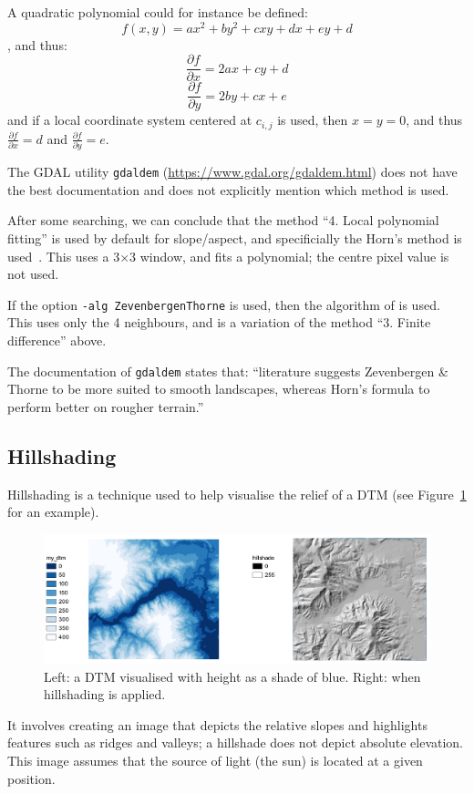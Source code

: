A quadratic polynomial could for instance be defined:
\[
  f(x,y) = ax^2 + by^2 + cxy + dx + ey +d
\]
, and thus:
\[
  \frac{\partial f}{\partial x} = 2ax + cy + d
\]
\[
  \frac{\partial f}{\partial y} = 2by + cx + e
\]
and if a local coordinate system centered at $c_{i,j}$ is used, then $x = y = 0$, and thus $\frac{\partial f}{\partial x} = d$ and $\frac{\partial f}{\partial y} = e$.


\begin{myfloat}
  \begin{practice-box}
  The GDAL utility \texttt{gdaldem} (\url{https://www.gdal.org/gdaldem.html}) does not have the best documentation and does not explicitly mention which method is used.

  After some searching, we can conclude that the method ``4. Local polynomial fitting'' is used by default for slope/aspect, and specificially the Horn's method is used~\citep{Horn81}.
  This uses a 3$\times$3 window, and fits a polynomial; the centre pixel value is not used.

  If the option \texttt{-alg ZevenbergenThorne} is used, then the algorithm of \citet{Zevenbergen87} is used. 
  This uses only the 4 neighbours, and is a variation of the method ``3. Finite difference'' above.

  The documentation of \texttt{gdaldem} states that: ``literature suggests Zevenbergen \& Thorne to be more suited to smooth landscapes, whereas Horn's formula to perform better on rougher terrain.''
  \end{practice-box}
\end{myfloat}

\subsection{Hillshading}

Hillshading is a technique used to help visualise the relief of a DTM (see Figure~\ref{fig:hillshade} for an example).
\begin{figure}
  \centering
  \includegraphics[width=\linewidth]{figs/hillshade}
  \caption{Left: a DTM visualised with height as a shade of blue. Right: when hillshading is applied.}
\label{fig:hillshade}
\end{figure}
It involves creating an image that depicts the relative slopes and highlights features such as ridges and valleys; a hillshade does not depict absolute elevation.
This image assumes that the source of light (the sun) is located at a given position.

